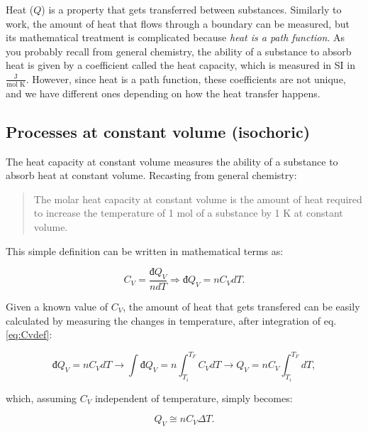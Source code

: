 \documentclass[
  9pt,
]{extbook}
\theoremstyle{definition}
\theoremstyle{definition}
\theoremstyle{definition}
\theoremstyle{remark}
\begin{document}
Heat (\(Q\)) is a property that gets transferred between substances. Similarly to work, the amount of heat that flows through a boundary can be measured, but its mathematical treatment is complicated because \emph{heat is a path function}.
As you probably recall from general chemistry, the ability of a substance to absorb heat is given by a coefficient called the heat capacity, which is measured in SI in \(\frac{\text{J}}{\text{mol K}}\). However, since heat is a path function, these coefficients are not unique, and we have different ones depending on how the heat transfer happens.

\hypertarget{processes-at-constant-volume-isochoric}{%
\subsection{Processes at constant volume (isochoric)}\label{processes-at-constant-volume-isochoric}}

The heat capacity at constant volume measures the ability of a substance to absorb heat at constant volume. Recasting from general chemistry:

\begin{quote}
The molar heat capacity at constant volume is the amount of heat required to increase the temperature of 1 mol of a substance by 1 K at constant volume.
\end{quote}

This simple definition can be written in mathematical terms as:

\begin{equation}
  C_V = \frac{đ Q_V}{n dT} \Rightarrow đ Q_V = n C_V dT.
  \label{eq:Cvdef}
\end{equation}

Given a known value of \(C_V\), the amount of heat that gets transfered can be easily calculated by measuring the changes in temperature, after integration of eq. \eqref{eq:Cvdef}:

\begin{equation}
  đ Q_V = n C_V dT \rightarrow \int đ Q_V = n \int_{T_i}^{T_F}C_V dT \rightarrow Q_V = n C_V \int_{T_i}^{T_F}dT,
  \label{eq:Cvint1}
\end{equation}

which, assuming \(C_V\) independent of temperature, simply becomes:

\begin{equation}
  Q_V \cong n C_V \Delta T.
  \label{eq:Cvint}
\end{equation}
\end{document}
